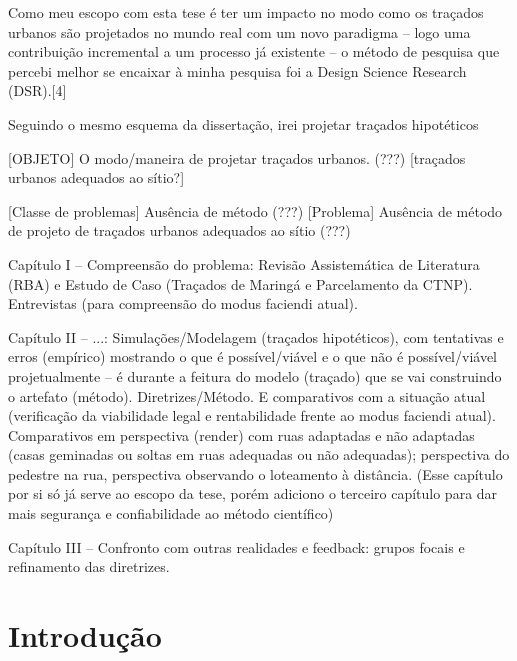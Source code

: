 \documentclass[]{report}
\begin{document}
	Como meu escopo com esta tese é ter um impacto no modo como os traçados urbanos são projetados no mundo real com um novo paradigma – logo uma contribuição incremental a um processo já existente – o método de pesquisa que percebi melhor se encaixar à minha pesquisa foi a Design Science Research (DSR).[4]

	Seguindo o mesmo esquema da dissertação, irei projetar traçados hipotéticos

	[OBJETO] O modo/maneira de projetar traçados urbanos. (???) [traçados urbanos adequados ao sítio?]

	[Classe de problemas] Ausência de método (???) [Problema] Ausência de método de projeto de traçados urbanos adequados ao sítio (???)

	Capítulo I – Compreensão do problema: Revisão Assistemática de Literatura (RBA) e Estudo de Caso (Traçados de Maringá e Parcelamento da CTNP). Entrevistas (para compreensão do modus faciendi atual).

	Capítulo II – ...: Simulações/Modelagem (traçados hipotéticos), com tentativas e erros (empírico) mostrando o que é possível/viável e o que não é possível/viável projetualmente – é durante a feitura do modelo (traçado) que se vai construindo o artefato (método). Diretrizes/Método. E comparativos com a situação atual (verificação da viabilidade legal e rentabilidade frente ao modus faciendi atual). Comparativos em perspectiva (render) com ruas adaptadas e não adaptadas (casas geminadas ou soltas em ruas adequadas ou não adequadas); perspectiva do pedestre na rua, perspectiva observando o loteamento à distância. (Esse capítulo por si só já serve ao escopo da tese, porém adiciono o terceiro capítulo para dar mais segurança e confiabilidade ao método científico)

	Capítulo III – Confronto com outras realidades e feedback: grupos focais e refinamento das diretrizes.


\chapter*{Introdução}
\end{document}
